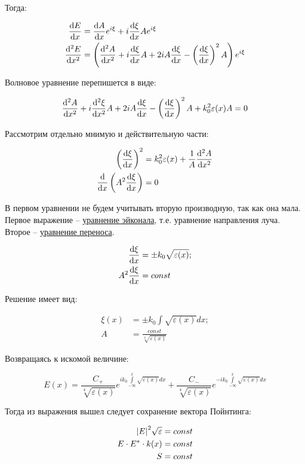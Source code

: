 \documentclass[10pt, a4paper]{article}
\begin{document}
Тогда:

\begin{align*}
	\dv{E}{x} &= \dv{A}{x} e^{i \xi} + i \dv{\xi}{x} Ae^{i\xi} \\
	\dv[2]{E}{x} &= \left(\dv[2]{A}{x} + i\dv{\xi}{x}A + 2iA\dv{\xi}{x} - \left(\dv{\xi}{x}\right)^2A\right)e^{i\xi}
\end{align*}

Волновое уравнение перепишется в виде:

\begin{equation*}
	\dv[2]{A}{x} + i\dv[2]{\xi}{x}A + 2iA\dv{\xi}{x} - \left(\dv{\xi}{x}\right)^2A + k_0^2\varepsilon(x)A = 0
\end{equation*}

Рассмотрим отдельно мнимую и действительную части:

\begin{align*}
	\left(\dv{\xi}{x}\right)^2 &= k_0^2\varepsilon(x) + \frac{1}{A} \dv[2]{A}{x} \\
	\dv{}{x}\left(A^2\dv{\xi}{x}\right) &= 0 
\end{align*}

В первом уравнении не будем учитывать вторую производную, так как она мала. Первое выражение -- \uline{уравнение эйконала}, т.е. уравнение направления луча. Второе -- \uline{уравнение переноса}.

\begin{align*}
	\dv{\xi}{x} &= \pm k_0\sqrt{\varepsilon(x)}; \\
	A^2 \dv{\xi}{x} &= const
\end{align*}

Решение имеет вид:

\begin{align*}
	\xi(x) &= \pm k_0 \int\sqrt{\varepsilon(x)} dx; \\
	A &= \frac{const}{\sqrt[4]{\varepsilon(x)}}
\end{align*}

Возвращаясь к искомой величине:

\begin{equation*}
	E(x) = \frac{C_+}{\sqrt[4]{\varepsilon(x)}} e^{ik_0 \int\limits_{-\infty}^x\sqrt{\varepsilon(x)} dx} +\frac{C_-}{\sqrt[4]{\varepsilon(x)}} e^{-ik_0 \int\limits_{-\infty}^x\sqrt{\varepsilon(x)} dx}
\end{equation*}

Тогда из выражения вышел следует сохранение вектора Пойнтинга:

\begin{align*}
	\abs{E}^2\sqrt{\varepsilon} &= const \\
	E\cdot E^{*} \cdot k(x) &= const \\
	S &= const
\end{align*}
\end{document}

